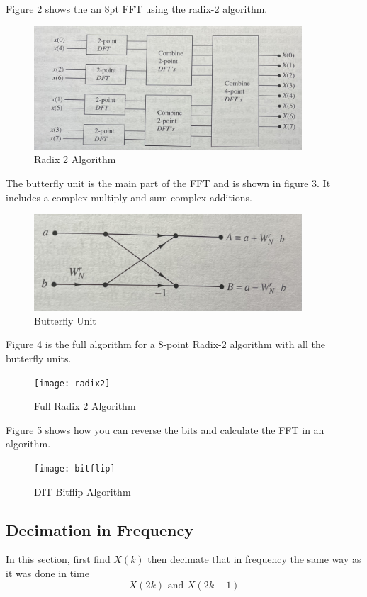 \documentclass{article} %
\begin{document}
	Figure 2 shows the an 8pt FFT using the radix-2 algorithm. 
	\begin{figure}[h]
	\centering
	\includegraphics[width=10cm]{2pt}
	\caption{Radix 2 Algorithm}
	\end{figure}
	
	The butterfly unit is the main part of the FFT and is shown in figure 3. It includes a complex multiply and sum complex additions. 
	\begin{figure}[h]
	\centering
	\includegraphics[width=10cm]{butterfly}
	\caption{Butterfly Unit}
	\end{figure}
	
	Figure 4 is the full algorithm for a 8-point Radix-2 algorithm with all the butterfly units. 
	\begin{figure}[h]
	\centering
	\texttt{[image: radix2]}
	\caption{Full Radix 2 Algorithm}
	\end{figure}
	
	Figure 5 shows how you can reverse the bits and calculate the FFT in an algorithm.
	\begin{figure}[h]
	\centering
	\texttt{[image: bitflip]}
	\caption{DIT Bitflip Algorithm}
	\end{figure}
	
	\subsection{Decimation in Frequency}
	In this section, first find $X(k)$ then decimate that in frequency the same way as it was done in time
	\begin{equation}
	X(2k) \text{ and } X(2k+1)
	\end{equation}
	
\end{document}
